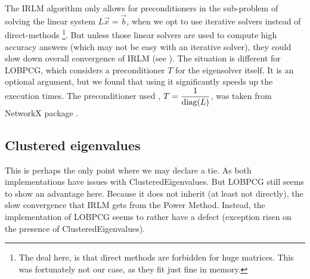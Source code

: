 The \gls{IRLM} algorithm only allows for preconditioners in the
sub-problem of solving the linear system $L\vec{x} = \vec{b}$, when we
opt to use iterative solvers instead of direct-methods \footnote{The deal
  here, is that direct methods are forbidden for huge matrices. This was
  fortunately not our case, as they fit just fine in memory.}. But
unless those linear solvers are used to compute high accuracy
answers (which may not be easy with an iterative solver), they could
slow down overall  convergence of \gls{IRLM} (see \cite{knyazev03}). The
situation is different for \gls{LOBPCG}, which considers a preconditioner $T$ for
the eigensolver itself. It is an optional argument, but we found that using
it significantly speeds up the execution times. The preconditioner
used , $T = \dfrac{1}{\operatorname{diag}(L)} $, was taken from NetworkX
package \cite{networkx}.

\subsection{Clustered eigenvalues}

This is perhaps the only point where we may declare a tie. As both
implementations have issues with \gls{ClusteredEigenvalues}. But
\gls{LOBPCG} still seems to show an advantage here. Because it does not
inherit (at least not directly), the slow convergence that \gls{IRLM}
gets from the Power Method. Instead, the implementation of
\gls{LOBPCG} seems to rather have a defect (exception risen on the
presence of \gls{ClusteredEigenvalues}).

